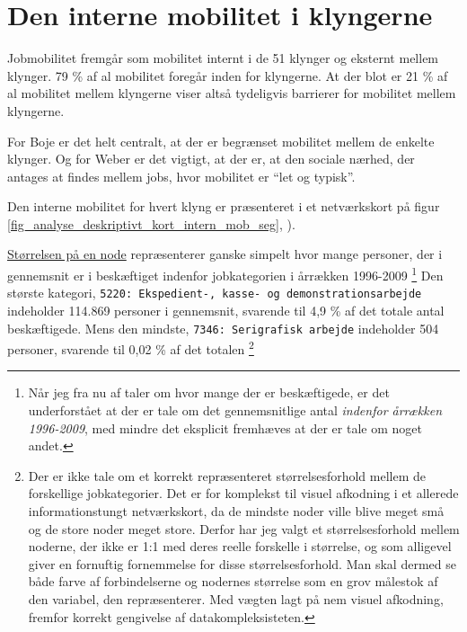 \section{Den interne mobilitet i klyngerne \label{analyse_deskriptivt_within_mob_seg}}

Jobmobilitet fremgår som mobilitet internt i de 51 klynger og eksternt mellem klynger. 79 \% af al mobilitet foregår inden for klyngerne. At der blot er 21 \% af al mobilitet mellem klyngerne viser altså tydeligvis barrierer for mobilitet mellem klyngerne.  %

For Boje er det helt centralt, at der er begrænset mobilitet mellem de enkelte klynger. Og for Weber er det vigtigt, at der er, at den sociale nærhed, der antages at findes mellem jobs, hvor mobilitet er “let og typisk”.

Den interne mobilitet for hvert klyng er præsenteret i et netværkskort på figur \ref{fig_analyse_deskriptivt_kort_intern_mob_seg}, ).

\underline{Størrelsen på en node} repræsenterer ganske simpelt hvor mange personer, der i gennemsnit er i beskæftiget indenfor jobkategorien i årrækken 1996-2009%
%
\footnote{Når jeg fra nu af taler om hvor mange der er beskæftigede, er det underforstået at der er tale om det gennemsnitlige antal \emph{indenfor årrækken 1996-2009}, med mindre det eksplicit fremhæves at der er tale om noget andet.}%
%
Den største kategori, \texttt{5220: Ekspedient-, kasse- og demonstrationsarbejde} indeholder 114.869 personer i gennemsnit, svarende til 4,9 \% af det totale antal beskæftigede. Mens den mindste, \texttt{7346: Serigrafisk arbejde} indeholder 504 personer, svarende til 0,02 \% af det totalen 
%
\footnote{Der er ikke tale om et korrekt repræsenteret størrelsesforhold mellem de forskellige jobkategorier. Det er for komplekst til visuel afkodning i et allerede informationstungt netværkskort, da de mindste noder ville blive meget små og de store noder meget store. Derfor har jeg valgt et størrelsesforhold mellem noderne, der ikke er 1:1 med deres reelle forskelle i størrelse, og som alligevel giver en fornuftig fornemmelse for disse størrelsesforhold. Man skal dermed se både farve af forbindelserne og nodernes størrelse som en grov målestok af den variabel, den repræsenterer. Med vægten lagt på nem visuel afkodning, fremfor korrekt gengivelse af datakompleksisteten.}%

